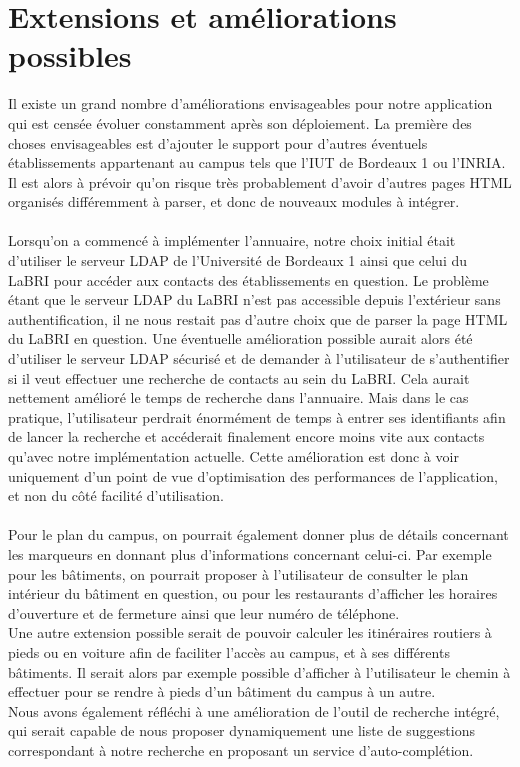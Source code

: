 \chapter{Extensions et améliorations possibles}
Il existe un grand nombre d’améliorations envisageables pour notre application qui est censée évoluer constamment après son déploiement.
La première des choses envisageables est d’ajouter le support pour d’autres éventuels établissements appartenant au campus tels que l’IUT de Bordeaux 1 ou l’INRIA. 
Il est alors à prévoir qu’on risque très probablement d’avoir d’autres pages HTML organisés différemment à parser, et donc de nouveaux modules à intégrer.\\\\
 
Lorsqu’on a commencé à implémenter l’annuaire, notre choix initial était d’utiliser le serveur LDAP de l’Université de Bordeaux 1 ainsi que celui du LaBRI pour accéder aux contacts des établissements en question. Le problème étant que le serveur LDAP du LaBRI n’est pas accessible depuis l’extérieur sans authentification, il ne nous restait pas d’autre choix que de parser la page HTML du LaBRI en question. Une éventuelle amélioration possible aurait alors été d’utiliser le serveur LDAP sécurisé et de demander à l’utilisateur de s’authentifier si il veut effectuer une recherche de contacts au sein du LaBRI. Cela aurait nettement amélioré le temps de recherche dans l’annuaire. Mais dans le cas pratique, l’utilisateur perdrait énormément de temps à entrer ses identifiants afin de lancer la recherche et accéderait finalement encore moins vite aux contacts qu’avec notre implémentation actuelle. Cette amélioration est donc à voir uniquement d’un point de vue d’optimisation des  performances de l’application, et non du côté facilité d’utilisation.\\\\

Pour le plan du campus, on pourrait également donner plus de détails concernant les marqueurs en donnant plus d’informations concernant celui-ci. Par exemple pour les bâtiments, on pourrait proposer à l’utilisateur de consulter le plan intérieur du bâtiment en question, ou pour les restaurants d’afficher les horaires d’ouverture et de fermeture ainsi que leur numéro de téléphone.\\
Une autre extension possible serait de pouvoir calculer les itinéraires routiers à pieds ou en voiture afin de faciliter l’accès au campus, et à ses différents bâtiments. Il serait alors par exemple possible d’afficher à l’utilisateur le chemin à effectuer pour se rendre à pieds d’un bâtiment du campus à un autre.\\
Nous avons également réfléchi à une amélioration de l’outil de recherche intégré, qui serait capable de nous proposer dynamiquement une liste de suggestions correspondant à notre recherche en proposant un service d'auto-complétion.\\\\


